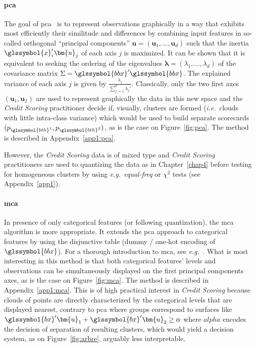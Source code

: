 \paragraph{\gls{pca}}

The goal of \gls{pca}~\cite{pages2014multiple} is to represent observations graphically in a way that exhibits most efficiently their similitude and differences by combining input features in so-called orthogonal ``principal components'' $\bm{u} = (\bm{u}_1,\dots,\bm{u}_d)$ such that the inertia $\glssymbol{x}_i' \bm{u}_j$ of each axis $j$ is maximized. It can be shown that it is equivalent to seeking the ordering of the eigenvalues $\bm{\lambda} = (\lambda_1,\dots,\lambda_d)$ of the covariance matrix $\Sigma = \glssymbol{bbx}'\glssymbol{bbx}$. The explained variance of each axis $j$ is given by $\frac{\lambda_j}{\sum_{j'=1}^d \lambda_j'}$. Classically, only the two first axes $(\bm{u}_1,\bm{u}_2)$ are used to represent graphically the data in this new space and the \textit{Credit Scoring} practitioner decide if, visually, clusters are formed (\textit{i.e.}\ clouds with little intra-class variance) which would be used to build separate scorecards $(p_{\glssymbol{bth}^{1}},p_{\glssymbol{bth}^{2}})$, as is the case on Figure~\ref{fig:pca}. The method is described in Appendix~\ref{app1:pca}.

However, the \textit{Credit Scoring} data is of mixed type and \textit{Credit Scoring} practitioners are used to quantizing the data as in Chapter~\ref{chap4} before testing for homogeneous clusters by using \textit{e.g.\ equal-freq} or $\chi^2$ tests (see Appendix~\ref{app1}).

\paragraph{\gls{mca}}

In presence of only categorical features (or following quantization), the \gls{mca} algorithm is more appropriate. It extends the \gls{pca} approach to categorical features by using the disjunctive table (dummy / one-hot encoding of $\glssymbol{bbx}$). For a thorough introduction to \gls{mca}, see \textit{e.g.}~\cite{lebart1995statistique}. What is most interesting in this method is that both categorical features' levels and observations can be simultaneously displayed on the first principal components axes, as is the case on Figure~\ref{fig:mca}. The method is described in Appendix~\ref{app1:mca}. This is of high practical interest in \textit{Credit Scoring} because clouds of points are directly characterized by the categorical levels that are displayed nearest, contrary to \gls{pca} where groups correspond to surfaces like $\glssymbol{bx} ' \bm{u}_1 + \glssymbol{bx} ' \bm{u}_2 \geq \alpha$ where $alpha$ encodes the decision of separation of resulting clusters, which would yield a decision system, as on Figure~\ref{fig:arbre}, arguably less interpretable.

